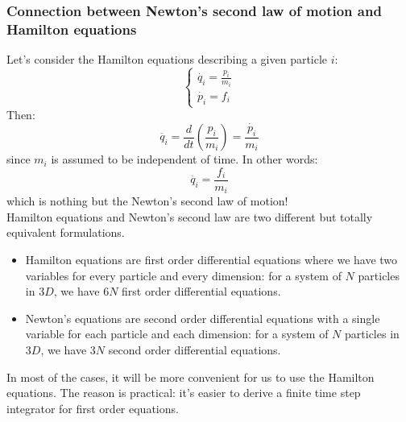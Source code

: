         \subsubsection{Connection between Newton's second law of motion and Hamilton equations}
        Let's consider the Hamilton equations describing a given particle $i$:
        \begin{equation}
            \begin{cases}
                \dot{q_i}=\frac{p_i}{m_i}\\
                \dot{p_i}=f_i
            \end{cases}
        \end{equation}
        Then:
        \begin{equation}
            \ddot{q_i}=\frac{d}{d t}(\frac{p_i}{m_i})=\frac{\dot{p_i}}{m_i}
        \end{equation}
        since $m_i$ is assumed to be independent of time.
        In other words:
        \begin{equation}
            \ddot{q_i}=\frac{f_i}{m_i}
        \end{equation}
        which is nothing but the Newton's second law of motion!
        \\Hamilton equations and Newton's second law are two different but totally equivalent formulations.
        \begin{itemize}
            \item Hamilton equations are first order differential equations where we have two variables for every particle and every dimension: for a system of $N$ particles in $3D$, we have $6N$ first order differential equations.
            \item Newton's equations are second order differential equations with a single variable for each particle and each dimension: for a system of $N$ particles in $3D$, we have $3N$ second order differential equations.
        \end{itemize}
        In most of the cases, it will be more convenient for us to use the Hamilton equations. The reason is practical: it's easier to derive a finite time step integrator for first order equations.
    
